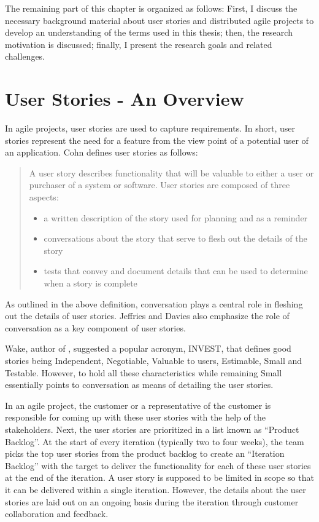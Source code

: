 The remaining part of this chapter is organized as follows: First, I discuss the necessary background material about user stories and distributed agile projects to develop an understanding of the terms used in this thesis; then, the research motivation is discussed; finally, I present the research goals and related challenges.

\section{User Stories - An Overview}
In agile projects, user stories are used to capture requirements. In short, user stories represent the need for a feature from the view point of a potential user of an application. Cohn \cite{user_stories_applied} defines user stories as follows:\\

\begin{quote}
	A user story describes functionality that will be valuable to either a user or purchaser of a system or software. User stories are composed of three aspects:
	\begin{itemize}
		\item a written description of the story used for planning and as a reminder
		\item conversations about the story that serve to flesh out the details of the story
		\item tests that convey and document details that can be used to determine when a story is complete
	\end{itemize}
\end{quote}

As outlined in the above definition, conversation plays a central role in fleshing out the details of user stories. Jeffries \cite{ron_jeffries} and Davies\cite{rachel_davies} also emphasize the role of conversation as a key component of user stories.

Wake, author of \cite{bill_wake}, suggested a popular acronym, INVEST, that defines good stories being Independent, Negotiable, Valuable to users, Estimable, Small and Testable. However, to hold all these characteristics while remaining Small essentially points to conversation as means of detailing the user stories.

In an agile project, the customer or a representative of the customer is responsible for coming up with these user stories with the help of the stakeholders. Next, the user stories are prioritized in a list known as ``Product Backlog''. At the start of every iteration (typically two to four weeks), the team picks the top user stories from the product backlog to create an ``Iteration Backlog'' with the target to deliver the functionality for each of these user stories at the end of the iteration. A user story is supposed to be limited in scope so that it can be delivered within a single iteration. However, the details about the user stories are laid out on an ongoing basis during the iteration through customer collaboration and feedback.

